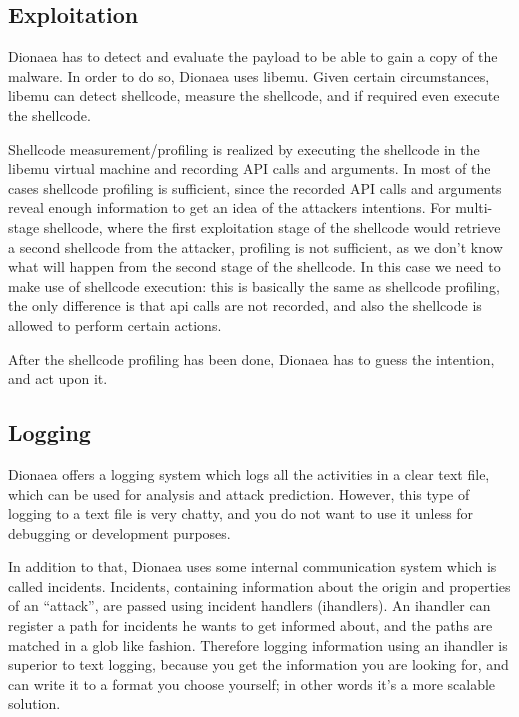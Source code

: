 \documentclass[epsfig,a4paper,11pt,titlepage,oneside,openany]{book}
\begin{document}
\subsection{Exploitation}

Dionaea has to detect and evaluate the payload to be able to gain a copy of the malware. In order to do so, Dionaea uses libemu. Given certain circumstances, libemu can detect shellcode, measure the shellcode, and if required even execute the shellcode.

Shellcode measurement/profiling is realized by executing the shellcode in the libemu virtual machine and recording API calls and arguments. In most of the cases shellcode profiling is sufficient, since the recorded API calls and arguments reveal enough information to get an idea of the attackers intentions. For multi-stage shellcode, where the first exploitation stage of the shellcode would retrieve a second shellcode from the attacker, profiling is not sufficient, as we don’t know what will happen from the second stage of the shellcode. In this case we need to make use of shellcode execution: this is basically the same as shellcode profiling, the only difference is that api calls are not recorded, and also the shellcode is allowed to perform certain actions.

After the shellcode profiling has been done, Dionaea has to guess the intention, and act upon it.

\subsection{Logging}

Dionaea offers a logging system which logs all the activities in a clear text file, which can be used for analysis and attack prediction. However, this type of logging to a text file is very chatty, and you do not want to use it unless for debugging or development purposes.

In addition to that, Dionaea uses some internal communication system which is called incidents. Incidents, containing information about the origin and properties of an “attack”, are passed using incident handlers (ihandlers). An ihandler can register a path for incidents he wants to get informed about, and  the paths are matched in a glob like fashion. Therefore logging information using an ihandler is superior to text logging, because you get the information you are looking for, and can write it to a format you choose yourself; in other words it’s a more scalable solution.
\end{document}
